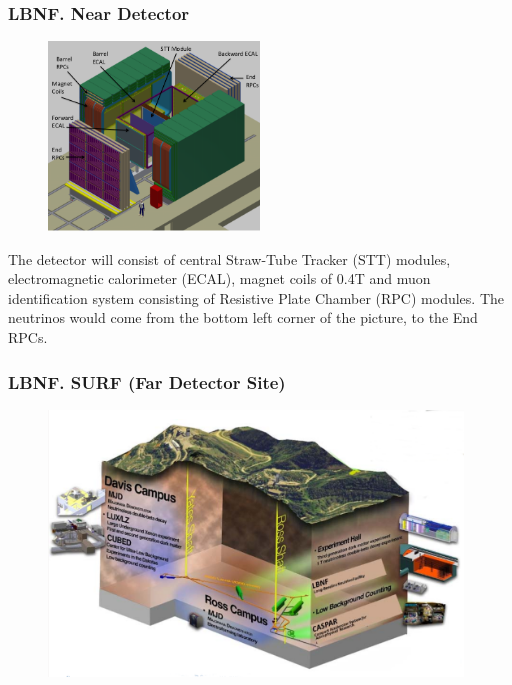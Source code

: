 \begin{frame}\frametitle{LBNF. Near Detector}
\scriptsize
\begin{figure}
\label{fig:nearDetector}
\centering
\includegraphics[width=0.50\textwidth, keepaspectratio=true]{figs/nearDetector.png}
\end{figure}
\scriptsize
The detector will consist of central Straw-Tube Tracker (STT) modules, electromagnetic calorimeter (ECAL), magnet coils of 0.4T and muon identification system consisting of Resistive Plate Chamber (RPC) modules. The neutrinos would come from the bottom left corner of the picture, to the End RPCs.\\
\end{frame}


\begin{frame}\frametitle{LBNF. SURF (Far Detector Site)}
\begin{figure}
\label{fig:farDetector_SURF1}
\centering
\includegraphics[width=0.98\textwidth, keepaspectratio=true]{figs/farDetector_SanfordUndergroundResearchFacility.png}
\end{figure}
\end{frame}

